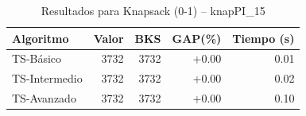 \begin{table}[h]
\centering
\caption{Resultados para Knapsack (0-1) -- knapPI_15}
\label{tab:knapsack_knapPI_15}
\begin{tabular}{lrrrr}
\hline
\textbf{Algoritmo} & \textbf{Valor} & \textbf{BKS} & \textbf{GAP(\%)} & \textbf{Tiempo (s)} \\
\hline
TS-Básico & 3732 & 3732 & +0.00 & 0.01 \\
TS-Intermedio & 3732 & 3732 & +0.00 & 0.02 \\
TS-Avanzado & 3732 & 3732 & +0.00 & 0.10 \\
\hline
\end{tabular}
\end{table}
